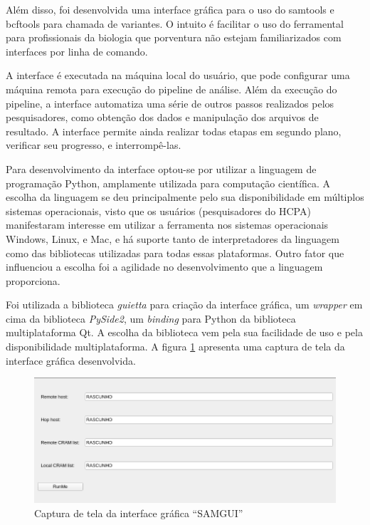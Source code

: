 \documentclass[cic,tc]{iiufrgs}
\begin{document}
Além disso, foi desenvolvida uma interface gráfica para o uso do samtools e
bcftools para chamada de variantes. O intuito é facilitar o uso do ferramental
para profissionais da biologia que porventura não estejam familiarizados com
interfaces por linha de comando.

A interface é executada na máquina local do usuário, que pode configurar uma
máquina remota para execução do pipeline de análise. Além da execução do
pipeline, a interface automatiza uma série de outros passos realizados pelos
pesquisadores, como obtenção dos dados e manipulação dos arquivos de resultado.
A interface permite ainda realizar todas etapas em segundo plano, verificar seu
progresso, e interrompê-las.

Para desenvolvimento da interface optou-se por utilizar a linguagem de
programação Python, amplamente utilizada para computação
científica.\cite{oliphant2007python} A escolha da linguagem se deu
principalmente pelo sua disponibilidade em múltiplos sistemas operacionais,
visto que os usuários (pesquisadores do HCPA) manifestaram interesse em
utilizar a ferramenta nos sistemas operacionais Windows, Linux, e Mac, e há
suporte tanto de interpretadores da linguagem como das bibliotecas utilizadas
para todas essas plataformas.\cite{oliphant2007python} Outro fator que
influenciou a escolha foi a agilidade no desenvolvimento que a linguagem
proporciona.\cite{oliphant2007python}

Foi utilizada a biblioteca \textit{guietta} para criação da interface
gráfica,\cite{guietta} um \textit{wrapper} em cima da biblioteca
\textit{PySide2}, um \textit{binding} para Python da biblioteca multiplataforma
Qt.\cite{loganathan2013pyside} A escolha da biblioteca vem pela sua facilidade
de uso e pela disponibilidade multiplataforma. A figura \ref{fig:samgui}
apresenta uma captura de tela da interface gráfica desenvolvida.

\begin{figure}
  \caption{Captura de tela da interface gráfica ``SAMGUI''}
    \begin{center}
      \includegraphics[width=0.85\linewidth]{img/samgui.png}
    \end{center}
    \label{fig:samgui}
\end{figure}
\end{document}
